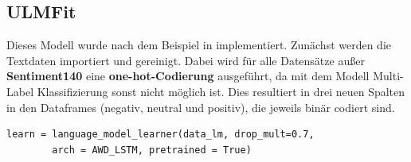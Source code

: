 \subsection{ULMFit}
Dieses Modell wurde nach dem Beispiel in \cite{ulm_model} implementiert. Zun\"achst werden die Textdaten importiert und gereinigt. Dabei wird f\"ur alle Datens\"atze au{\ss}er \textbf{Sentiment140} eine \textbf{one-hot-Codierung} ausgef\"uhrt, da mit dem Modell Multi-Label Klassifizierung sonst nicht m\"oglich ist. Dies resultiert in drei neuen Spalten in den Dataframes (negativ, neutral und positiv), die jeweils bin\"ar codiert sind.\\

\lstset{language=Python}
\lstset{frame=lines}
\lstset{captionpos=b}
\lstset{basicstyle=\footnotesize}
\begin{lstlisting}
learn = language_model_learner(data_lm, drop_mult=0.7, 
		arch = AWD_LSTM, pretrained = True)
\end{lstlisting}

